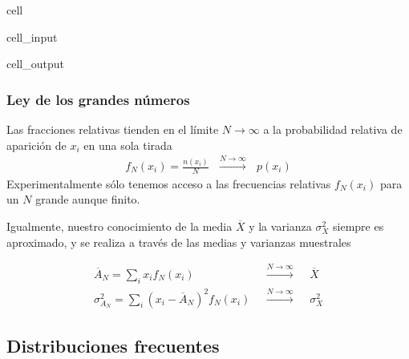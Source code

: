 \documentclass[letterpaper,10pt,english]{jupyterBook}
\begin{document}
\begin{sphinxuseclass}{cell}
\begin{sphinxVerbatimInput}
\begin{sphinxuseclass}{cell_input}
\begin{sphinxVerbatim}[commandchars=\\\{\}]
\end{sphinxVerbatim}

\end{sphinxuseclass}\end{sphinxVerbatimInput}
\begin{sphinxVerbatimOutput}

\begin{sphinxuseclass}{cell_output}
\noindent{}

\end{sphinxuseclass}\end{sphinxVerbatimOutput}

\end{sphinxuseclass}

\subsubsection{Ley de los grandes números}
\label{\detokenize{docs/Part_01_Formalismo/Chapter_01_02_Formalismo_matem_xe1tico/01_05_Probabilidades_myst:ley-de-los-grandes-numeros}}
\sphinxAtStartPar
Las fracciones relativas tienden en el límite \(N\to \infty\) a la probabilidad relativa de aparición de  \(x_i\) en una sola tirada
\begin{equation*}
\begin{split}
f_N(x_i) = \frac{n(x_i)}{N}~~~\stackrel{N\to\infty}{\longrightarrow}~~~{p(x_i)}
\end{split}
\end{equation*}
\sphinxAtStartPar
Experimentalmente sólo tenemos acceso a las frecuencias relativas \(f_N(x_i)\) para un \(N\) grande aunque finito.

\sphinxAtStartPar
Igualmente, nuestro conocimiento de la  media \(\overline X\)  y la varianza \(\sigma_X^2\) siempre es aproximado, y se realiza a través de las medias y varianzas muestrales

\begin{eqnarray*}
\overline{A}_N = \sum_i x_i f_N(x_i)~~~&\stackrel{N\to\infty}{\longrightarrow}&~~~ \overline{X}\\
\sigma_{A_N}^2 = \sum_{i} (x_i - \overline{A}_N)^2 f_N(x_i) ~~~&\stackrel{N\to\infty}{\longrightarrow}&~~~ \sigma_X^2
\end{eqnarray*}


\subsection{Distribuciones frecuentes}
\label{\detokenize{docs/Part_01_Formalismo/Chapter_01_02_Formalismo_matem_xe1tico/01_05_Probabilidades_myst:distribuciones-frecuentes}}
\end{document}
